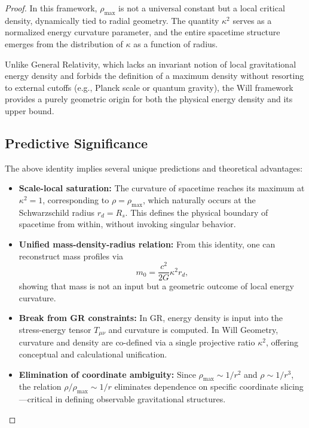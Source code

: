 \documentclass{article}
\begin{document}
\begin{proof}
In this framework, \( \rho_{\text{max}} \) is not a universal constant but a local critical density, dynamically tied to radial geometry. The quantity \( \kappa^2 \) serves as a normalized energy curvature parameter, and the entire spacetime structure emerges from the distribution of \( \kappa \) as a function of radius.

Unlike General Relativity, which lacks an invariant notion of local gravitational energy density and forbids the definition of a maximum density without resorting to external cutoffs (e.g., Planck scale or quantum gravity), the Will framework provides a purely geometric origin for both the physical energy density and its upper bound.

\subsection*{Predictive Significance}

The above identity implies several unique predictions and theoretical advantages:

\begin{itemize}
  \item \textbf{Scale-local saturation:} The curvature of spacetime reaches its maximum at \( \kappa^2 = 1 \), corresponding to \( \rho = \rho_{\text{max}} \), which naturally occurs at the Schwarzschild radius \( r_{d} = R_s \). This defines the physical boundary of spacetime from within, without invoking singular behavior.

  \item \textbf{Unified mass-density-radius relation:} From this identity, one can reconstruct mass profiles via
  \[
  m_0 = \frac{c^2}{2G} \kappa^2r_{d},
  \]
  showing that mass is not an input but a geometric outcome of local energy curvature.

  \item \textbf{Break from GR constraints:} In GR, energy density is input into the stress-energy tensor \( T_{\mu\nu} \) and curvature is computed. In Will Geometry, curvature and density are co-defined via a single projective ratio \( \kappa^2 \), offering conceptual and calculational unification.

  \item \textbf{Elimination of coordinate ambiguity:} Since \( \rho_{\text{max}} \sim 1/r^2 \) and \( \rho \sim 1/r^3 \), the relation \( \rho/\rho_{\text{max}} \sim 1/r \) eliminates dependence on specific coordinate slicing—critical in defining observable gravitational structures.
\end{itemize}


\end{proof}
\end{document}
